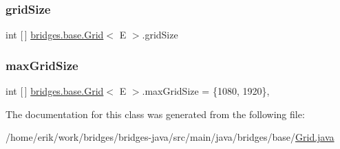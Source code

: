 \mbox{\label{classbridges_1_1base_1_1_grid_a54a66479f78022570253d771206a0420}} 
\subsubsection{\texorpdfstring{grid\+Size}{gridSize}}
{\footnotesize\ttfamily int \mbox{[}$\,$\mbox{]} \hyperlink{classbridges_1_1base_1_1_grid}{bridges.\+base.\+Grid}$<$ E $>$.grid\+Size\hspace{0.3cm}{\ttfamily [protected]}}

\mbox{\label{classbridges_1_1base_1_1_grid_a803fd4c070a22863c82581f0bb258c1c}} 
\subsubsection{\texorpdfstring{max\+Grid\+Size}{maxGridSize}}
{\footnotesize\ttfamily int \mbox{[}$\,$\mbox{]} \hyperlink{classbridges_1_1base_1_1_grid}{bridges.\+base.\+Grid}$<$ E $>$.max\+Grid\+Size = \{1080, 1920\}\hspace{0.3cm}{\ttfamily [static]}, {\ttfamily [protected]}}



The documentation for this class was generated from the following file\+:\begin{DoxyCompactItemize}
\item 
/home/erik/work/bridges/bridges-\/java/src/main/java/bridges/base/\hyperlink{_grid_8java}{Grid.\+java}\end{DoxyCompactItemize}
